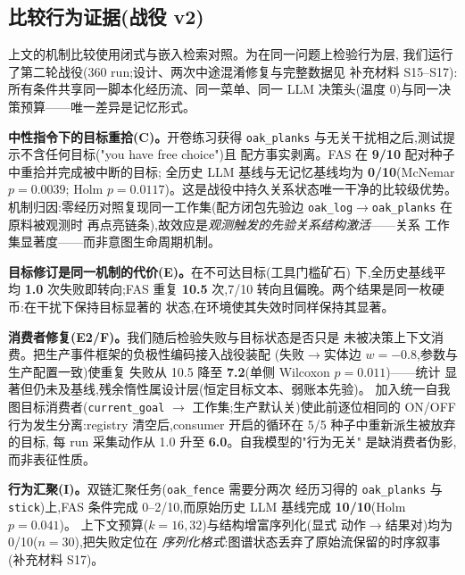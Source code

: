
\subsection{比较行为证据(战役 v2)}
\label{sec:res-campaign}

上文的机制比较使用闭式与嵌入检索对照。为在同一问题上检验行为层,
我们运行了第二轮战役(360 run;设计、两次中途混淆修复与完整数据见
补充材料 S15--S17):所有条件共享同一脚本化经历流、同一菜单、同一
LLM 决策头(温度 0)与同一决策预算——唯一差异是记忆形式。

\textbf{中性指令下的目标重拾(C)。}开卷练习获得 \texttt{oak\_planks}
与无关干扰相之后,测试提示不含任何目标("you have free choice")且
配方事实剥离。FAS 在 \textbf{9/10} 配对种子中重拾并完成被中断的目标;
全历史 LLM 基线与无记忆基线均为 \textbf{0/10}(McNemar $p{=}0.0039$;
Holm $p{=}0.0117$)。这是战役中持久关系状态唯一干净的比较级优势。
机制归因:零经历对照复现同一工作集(配方闭包先验边
\texttt{oak\_log}$\rightarrow$\texttt{oak\_planks} 在原料被观测时
再点亮链条),故效应是\emph{观测触发的先验关系结构激活}——关系
工作集显著度——而非意图生命周期机制。

\textbf{目标修订是同一机制的代价(E)。}在不可达目标(工具门槛矿石)
下,全历史基线平均 \textbf{1.0} 次失败即转向;FAS 重复 \textbf{10.5}
次,7/10 转向且偏晚。两个结果是同一枚硬币:在干扰下保持目标显著的
状态,在环境使其失效时同样保持其显著。

\textbf{消费者修复(E2/F)。}我们随后检验失败与目标状态是否只是
未被决策上下文消费。把生产事件框架的负极性编码接入战役装配
(失败$\rightarrow$实体边 $w{=}{-}0.8$,参数与生产配置一致)使重复
失败从 10.5 降至 \textbf{7.2}(单侧 Wilcoxon $p{=}0.011$)——统计
显著但仍未及基线,残余惰性属设计层(恒定目标文本、弱账本先验)。
加入统一自我图目标消费者(\texttt{current\_goal} $\rightarrow$
工作集;生产默认关)使此前逐位相同的 ON/OFF 行为发生分离:registry
清空后,consumer 开启的循环在 5/5 种子中重新派生被放弃的目标,
每 run 采集动作从 1.0 升至 \textbf{6.0}。自我模型的"行为无关"
是缺消费者伪影,而非表征性质。

\textbf{行为汇聚(I)。}双链汇聚任务(\texttt{oak\_fence} 需要分两次
经历习得的 \texttt{oak\_planks} 与 \texttt{stick})上,FAS 条件完成
0--2/10,而原始历史 LLM 基线完成 \textbf{10/10}(Holm $p{=}0.041$)。
上下文预算($k{=}16,32$)与结构增富序列化(显式
动作$\rightarrow$结果对)均为 0/10($n{=}30$),把失败定位在
\emph{序列化格式}:图谱状态丢弃了原始流保留的时序叙事
(补充材料 S17)。


